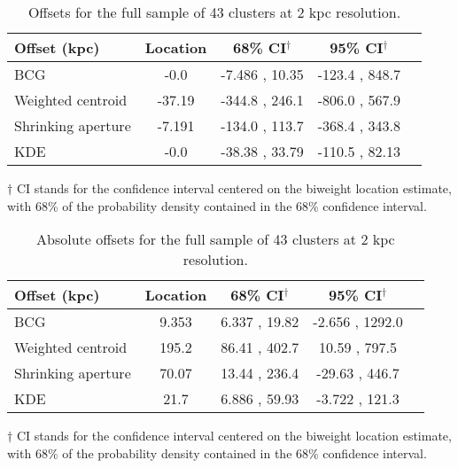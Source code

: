 \begin{table}
\caption{Offsets for the full sample of 43 clusters at 2 kpc resolution.}
\begin{center}
\begin{tabular}{@{}lcccc}

\hline \hline Offset (kpc) & Location & 68\% CI$^\dagger$ & 95\% CI$^\dagger$ \\ \hline

BCG & -0.0 & -7.486 ,  10.35 & -123.4 , 848.7 \\
Weighted centroid & -37.19 & -344.8 ,  246.1 & -806.0 , 567.9 \\
Shrinking aperture & -7.191 & -134.0 ,  113.7 & -368.4 , 343.8 \\
KDE & -0.0 & -38.38 ,  33.79 & -110.5 , 82.13 \\
\hline
\end{tabular} 
\end{center} 
\label{tab:full2kpc_offsets}
\footnotesize{$\dagger$ CI stands for the confidence interval centered on the 
	biweight location estimate, with 68\% of the probability density contained 
	in the 68\% confidence interval.}\\
\end{table}
\begin{table}
\caption{Absolute offsets for the full sample of 43 clusters at 2 kpc resolution.}
\begin{center}
\begin{tabular}{@{}lcccc}

\hline \hline Offset (kpc) & Location & 68\% CI$^\dagger$ & 95\% CI$^\dagger$ \\ \hline

BCG & 9.353 & 6.337 ,  19.82 & -2.656 , 1292.0 \\
Weighted centroid & 195.2 & 86.41 ,  402.7 & 10.59 , 797.5 \\
Shrinking aperture & 70.07 & 13.44 ,  236.4 & -29.63 , 446.7 \\
KDE & 21.7 & 6.886 ,  59.93 & -3.722 , 121.3 \\
\hline
\end{tabular} 
\end{center} 
\label{tab:full_2kpc_abs_offsets}
\footnotesize{$\dagger$ CI stands for the confidence interval centered on the 
	biweight location estimate, with 68\% of the probability density contained in 
	the 68\% confidence interval.}\\
\end{table}
